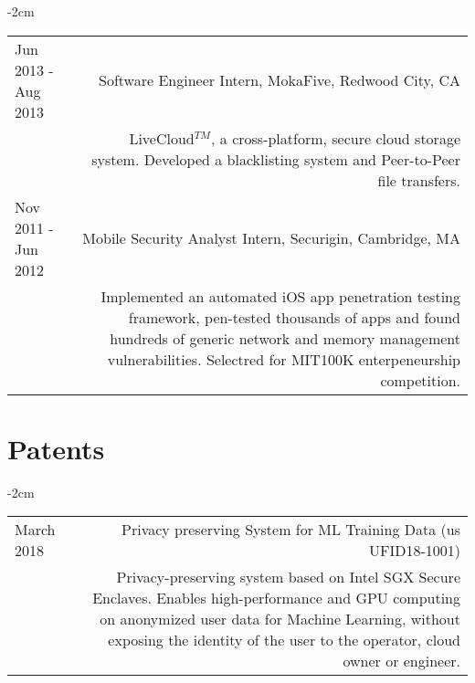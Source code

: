 \documentclass[lettersize,10pt]{article}
\begin{document}
\begin{adjustwidth}{}{-2cm}
\begin{tabularx}{\textwidth}{L R}
	Jun 2013 - Aug 2013 & {\sc Software Engineer Intern, MokaFive}, Redwood City, CA \\
	& LiveCloud$^{TM}$, a cross-platform, secure cloud storage system. Developed a blacklisting system and Peer-to-Peer file transfers. \\
	Nov 2011 - Jun 2012 & {\sc Mobile Security Analyst Intern, Securigin}, Cambridge, MA \\

	& Implemented an automated iOS app penetration testing framework, pen-tested thousands of apps and found hundreds of generic network and
	  memory management vulnerabilities. Selectred for MIT100K enterpeneurship competition. \\
\end{tabularx}
\end{adjustwidth}

\section{Patents}
\begin{adjustwidth}{}{-2cm}
  \begin{tabularx}{\textwidth}{L R}
    March 2018 & {\sc Privacy preserving System for ML Training Data (us UFID18-1001)} \\
	& Privacy-preserving system based on Intel SGX Secure Enclaves. Enables high-performance and GPU computing on anonymized user data
    for Machine Learning, without exposing the identity of the user to the operator, cloud owner or engineer. \\
  \end{tabularx}
\end{adjustwidth}

\end{document}
